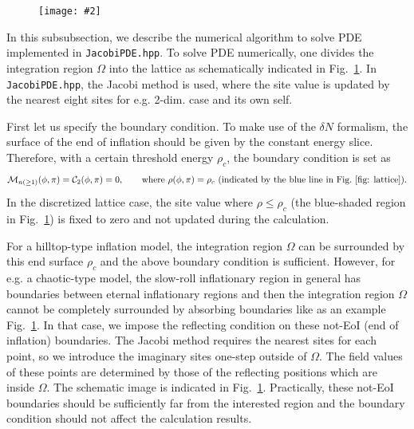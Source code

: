 \documentclass[aps, prd
, preprint
, nofootinbib 
, longbibliography
]{revtex4-1}
\newcommand{\calC}{\mathcal{C}}
\newcommand{\calM}{\mathcal{M}}
\newcommand{\bae}[1]{\begin{align} #1 \end{align}}
\newcommand{\bfe}[4]{
\begin{figure} 
	\centering
	\texttt{[image: \#2]}
	\caption{#3}
	\label{#4}
\end{figure}}
\begin{document}
\bfe{width=\hsize}{figs/lattice.pdf}{}{fig: lattice}

In this subsubsection, we describe the numerical algorithm to solve PDE implemented in \texttt{JacobiPDE.hpp}.
To solve PDE numerically, one divides the integration region $\Omega$ into the lattice as schematically indicated in Fig.~\ref{fig: lattice}.
In \texttt{JacobiPDE.hpp}, the Jacobi method is used, where the site value is updated by the nearest eight sites for e.g. 2-dim. case and its own self.

First let us specify the boundary condition. To make use of the $\delta N$ formalism, the surface of the end of inflation should be given by the constant energy slice.
Therefore, with a certain threshold energy $\rho_c$, the boundary condition is set as
\bae{
	\calM_{n(\ge1)}(\phi,\pi)=\calC_2(\phi,\pi)=0, \qquad \text{where $\rho(\phi,\pi)=\rho_c$ (indicated by the blue line in Fig.~\ref{fig: lattice})}.
}
In the discretized lattice case, the site value where $\rho\le\rho_c$ (the blue-shaded region in Fig.~\ref{fig: lattice}) is fixed to zero and not updated during the calculation.

For a hilltop-type inflation model, the integration region $\Omega$ can be surrounded by this end surface $\rho_c$ and the above boundary condition is sufficient.
However, for e.g. a chaotic-type model, the slow-roll inflationary region in general has boundaries between eternal inflationary regions and then the integration region 
$\Omega$ cannot be completely surrounded by absorbing boundaries like as an example Fig.~\ref{fig: lattice}.
In that case, we impose the reflecting condition on these not-EoI (end of inflation) boundaries. 
The Jacobi method requires the nearest sites for each point, so we introduce the imaginary sites one-step outside of $\Omega$.
The field values of these points are determined by those of the reflecting positions which are inside $\Omega$.
The schematic image is indicated in Fig.~\ref{fig: lattice}. Practically, these not-EoI boundaries should be sufficiently far from the interested region
and the boundary condition should not affect the calculation results.
\end{document}
